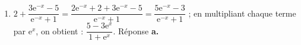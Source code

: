 \begin{enumerate}
Si $F(x) = \dfrac13 x^3 \left(\ln x - \dfrac13 \right)$, alors 
$F'(x) = x^2\left(\ln x - \dfrac13 \right) + \dfrac13 x^3 \times \dfrac{1}{x} = x^2 \ln x - \dfrac13 x^2  + \dfrac13 x^2 = x^2 \ln x = f(x)$. \hfill Réponse \textbf{a.}

\item %


$2 + \dfrac{3\text{e}^{-x} - 5}{\text{e}^{-x} + 1} = \dfrac{2\text{e}^{-x} + 2  + 3\text{e}^{-x} - 5}{\text{e}^{-x} + 1} = \dfrac{5\text{e}^{-x} - 3}{\text{e}^{-x} + 1}$ ; en multipliant chaque terme par $\text{e}^x$, on obtient : $\dfrac{5 - 3\text{e}^x}{1 + \text{e}^x}$. \hfill Réponse \textbf{a.}
\end{enumerate}

\bigskip

